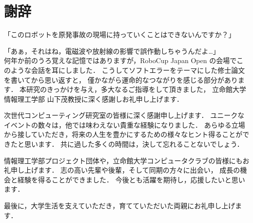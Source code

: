 \chapter*{謝辞}

「このロボットを原発事故の現場に持っていくことはできないんですか？」\par
「あぁ，それはね，電磁波や放射線の影響で誤作動しちゃうんだよ…」\\
何年か前のうろ覚えな記憶ではありますが，RoboCup Japan Open の会場でこのような会話を耳にしました．
こうしてソフトエラーをテーマにした修士論文を書いてから思い返すと，
僅かながら運命的なつながりを感じる部分があります．
本研究のきっかけを与え，多大なるご指導をして頂きました，
立命館大学 情報理工学部 山下茂教授に深く感謝しお礼申し上げます．

次世代コンピューティング研究室の皆様に深く感謝申し上げます．
ユニークなイベントの数々は，他では味わえない貴重な経験になりました．
あらゆる立場から接していただき，将来の人生を豊かにするための様々なヒント得ることができたと思います．
共に過した多くの時間は，決して忘れることないでしょう．

情報理工学部プロジェクト団体や，立命館大学コンピュータクラブの皆様にもお礼申し上げます．
志の高い先輩や後輩，そして同期の方々に出会い，
成長の機会と経験を得ることができました．
今後とも活躍を期待し，応援したいと思います．

最後に，大学生活を支えていただき，育てていただいた両親にお礼申し上げます．
